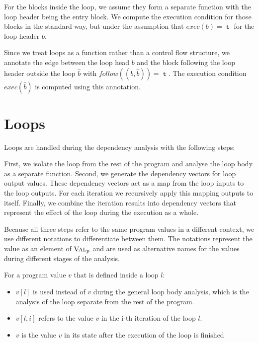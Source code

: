 For the blocks inside the loop, we assume they form a separate function with the loop header being the entry block. We compute the execution condition for those blocks in the standard way, but under the assumption that $exec(b) = \mttt$ for the loop header $b$.

Since we treat loops as a function rather than a control flow structure, we annotate the edge between the loop head $b$ and the block following the loop header outside the loop $\hat{b}$ with $follow((b, \hat{b})) = \mttt$. The execution condition $exec(\hat{b})$ is computed using this annotation.

\section{Loops}\label{sec:loops}
Loops are handled during the dependency analysis with the following steps:

First, we isolate the loop from the rest of the program and analyse the loop body as a separate function. Second, we generate the dependency vectors for loop output values. These dependency vectors act as a map from the loop inputs to the loop outputs. For each iteration we recursively apply this mapping outputs to itself. Finally, we combine the iteration results into dependency vectors that represent the effect of the loop during the execution as a whole.

Because all three steps refer to the same program values in a different context, we use different notations to differentiate between them. The notations represent the value as an element of $\textsc{Val}_p$ and are used as alternative names for the values during different stages of the analysis.

For a program value $v$ that is defined inside a loop $l$:
\begin{itemize}
    \setlength\itemsep{0em}
    \item $v[l]$ is used instead of $v$ during the general loop body analysis, which is the analysis of the loop separate from the rest of the program.
    \item $v[l, i]$ refers to the value $v$ in the i-th iteration of the loop $l$.
    \item $v$ is the value $v$ in its state after the execution of the loop is finished
\end{itemize}

